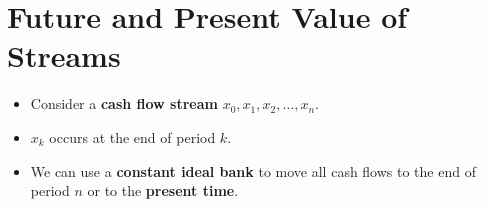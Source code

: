 \section{Future and Present Value of Streams}

\begin{itemize}
    \item Consider a \textbf{cash flow stream} \( x_0, x_1, x_2, \ldots, x_n \).
    \item \( x_k \) occurs at the end of period \( k \).
    \item We can use a \textbf{constant ideal bank} to move all cash flows to the end of period \( n \) or to the \textbf{present time}.
\end{itemize}



